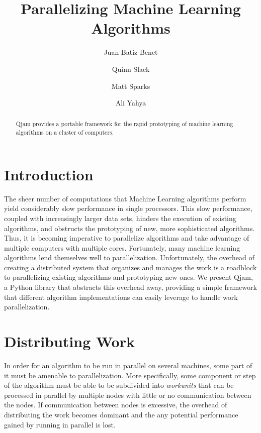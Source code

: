 \documentclass[%
  final,
  notitlepage,
  narroweqnarray,
  inline,
]{ieee}
\begin{document}
\title{Parallelizing Machine Learning Algorithms}

\author[SHORT NAMES]{
  Juan Batiz-Benet \\
  \and{\quad\quad}
  Quinn Slack \\
  \and{\quad\quad}
  Matt Sparks \\
  \and{\quad\quad}
  Ali Yahya
}

\maketitle

\begin{abstract}
Qjam provides a portable framework for the rapid prototyping of machine
learning algorithms on a cluster of computers.
\end{abstract}

\section{Introduction}
The sheer number of computations that Machine Learning algorithms perform yield
considerably slow performance in single processors. This slow performance,
coupled with increasingly larger data sets, hinders the execution of existing
algorithms, and obstructs the prototyping of new, more sophisticated
algorithms. Thus, it is becoming imperative to parallelize algorithms and take
advantage of multiple computers with multiple cores. Fortunately, many machine
learning algorithms lend themselves well to parallelization. Unfortunately, the
overhead of creating a distributed system that organizes and manages the work
is a roadblock to parallelizing existing algorithms and prototyping new
ones. We present Qjam, a Python library that abstracts this overhead away,
providing a simple framework that different algorithm implementations can
easily leverage to handle work parallelization.

\section{Distributing Work}

In order for an algorithm to be run in parallel on several machines, some part
of it must be amenable to parallelization. More specifically, some component or
step of the algorithm must be able to be subdivided into \emph{workunits} that
can be processed in parallel by multiple nodes with little or no communication
between the nodes. If communication between nodes is excessive, the overhead of
distributing the work becomes dominant and the any potential performance gained
by running in parallel is lost.
\end{document}

